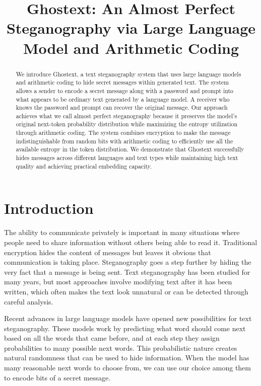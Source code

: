 \documentclass[sigconf,review,anonymous]{acmart}
\begin{document}
\title{Ghostext: An Almost Perfect Steganography via Large Language Model and Arithmetic Coding}
\author{}
\maketitle

\begin{abstract}
We introduce Ghostext, a text steganography system that uses large language models and arithmetic coding to hide secret messages within generated text. The system allows a sender to encode a secret message along with a password and prompt into what appears to be ordinary text generated by a language model. A receiver who knows the password and prompt can recover the original message. Our approach achieves what we call almost perfect steganography because it preserves the model's original next-token probability distribution while maximizing the entropy utilization through arithmetic coding. The system combines encryption to make the message indistinguishable from random bits with arithmetic coding to efficiently use all the available entropy in the token distribution. We demonstrate that Ghostext successfully hides messages across different languages and text types while maintaining high text quality and achieving practical embedding capacity.
\end{abstract}


\section{Introduction}

The ability to communicate privately is important in many situations where people need to share information without others being able to read it. Traditional encryption hides the content of messages but leaves it obvious that communication is taking place. Steganography goes a step further by hiding the very fact that a message is being sent. Text steganography has been studied for many years, but most approaches involve modifying text after it has been written, which often makes the text look unnatural or can be detected through careful analysis.

Recent advances in large language models have opened new possibilities for text steganography. These models work by predicting what word should come next based on all the words that came before, and at each step they assign probabilities to many possible next words. This probabilistic nature creates natural randomness that can be used to hide information. When the model has many reasonable next words to choose from, we can use our choice among them to encode bits of a secret message.
\end{document}
